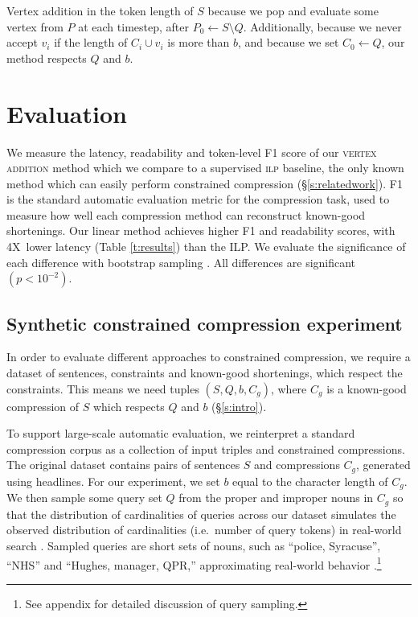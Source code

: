\documentclass[11pt,a4paper]{article}
\newcommand{\speedup}[0]{4X~}
\begin{document}
Vertex addition in the token length of $S$ because we pop and evaluate some vertex from $P$ at each timestep, after $P_0  \gets S \setminus Q$. Additionally, because we never accept $v_i$ if the length of $C_i \cup v_i$ is more than $b$, and because we set $C_0 \gets Q$, our method respects $Q$ and $b$.

\section{Evaluation}\label{s:autoeval}

We measure the latency, readability and token-level F1 score of our \textsc{vertex addition} method which we compare to a supervised \textsc{ilp} baseline, the only known method which can easily perform constrained compression (\S\ref{s:relatedwork}). F1 is the standard automatic evaluation metric for the compression task, used to measure how well each compression method can reconstruct known-good shortenings. Our linear method achieves higher F1 and readability scores, with \speedup lower latency (Table \ref{t:results}) than the ILP. We evaluate the significance of each difference with bootstrap sampling \cite{D12-1091}. All differences are significant {\small $(p < 10^{-2})$}. 

\subsection{Synthetic constrained compression experiment}\label{s:constrained}

In order to evaluate different approaches to constrained compression, we require a dataset of sentences, constraints and known-good shortenings, which respect the constraints. This means we need tuples $(S, Q, b, C_g)$, where $C_g$ is a known-good compression of $S$ which respects $Q$ and $b$ (\S\ref{s:intro}).

To support large-scale automatic evaluation, we reinterpret a standard compression corpus \cite{filippova2013overcoming}
as a collection of input triples and constrained compressions. The original dataset contains pairs of sentences $S$ and compressions $C_g$, generated using headlines. For our experiment, we set $b$ equal to  the character length of $C_g$. We then sample some query set $Q$ from the proper and improper nouns in $C_g$ so that the distribution of cardinalities of queries across our dataset simulates the observed distribution of cardinalities (i.e.\ number of query tokens) in real-world search \cite{Jansen2000RealLR}. Sampled queries are short sets of nouns, such as ``police, Syracuse'', ``NHS'' and ``Hughes, manager, QPR,'' approximating real-world behavior \cite{Barr2008TheLS}.\footnote{See appendix for detailed discussion of query sampling.} 
\end{document}
